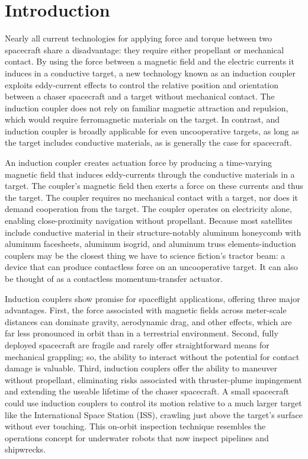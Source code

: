 \section{Introduction} 

Nearly all current technologies for applying force and torque between two spacecraft share a disadvantage: they require either propellant or mechanical contact. By using the force between a magnetic field and the electric currents it induces in a conductive target, a new technology known as an induction coupler exploits eddy-current effects to control the relative position and orientation between a chaser spacecraft and a target without mechanical contact. The induction coupler does not rely on familiar magnetic attraction and repulsion, which would require ferromagnetic materials on the target.  In contrast, and induction coupler is broadly applicable for even uncooperative targets, as long as the target includes conductive materials, as is generally the case for spacecraft.

An induction coupler creates actuation force by producing a time-varying magnetic field that induces eddy-currents  through the conductive materials in a target. The coupler's magnetic field then exerts a force on these currents and thus the target. The coupler requires no mechanical contact with a target, nor does it demand cooperation from the target. The coupler operates on electricity alone, enabling close-proximity navigation without propellant. Because most satellites include conductive material in their structure-notably aluminum honeycomb with aluminum facesheets, aluminum isogrid, and aluminum truss elements-induction couplers may be the closest thing we have to science fiction's tractor beam: a device that can produce contactless force on an uncooperative target. It can also be thought of as a contactless momentum-transfer actuator.

Induction couplers show promise for spaceflight applications, offering three major advantages. First, the force associated with magnetic fields across meter-scale distances can dominate gravity, aerodynamic drag, and other effects, which are far less pronounced in orbit than in a terrestrial environment. Second, fully deployed spacecraft are fragile and rarely offer straightforward means for mechanical grappling; so, the ability to interact without the potential for contact damage is valuable. Third, induction couplers offer the ability to maneuver without propellant, eliminating risks associated with thruster-plume impingement \cite{BaerwaldR.S.1977}
and extending the useable lifetime of the chaser spacecraft.
A small spacecraft could use induction couplers to control its motion relative to a much larger target like the International Space Station (ISS), crawling just above the target's surface without ever touching. This on-orbit inspection technique resembles the operations concept for underwater robots that now inspect pipelines and shipwrecks. \cite{Whitcomb2000}

